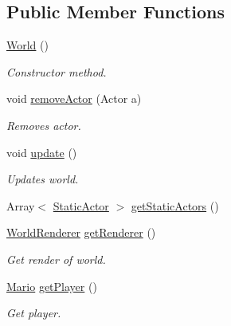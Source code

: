\subsection*{Public Member Functions}
\begin{DoxyCompactItemize}
\item 
\hyperlink{classnl_1_1arjanfrans_1_1mario_1_1model_1_1World_abc0eb7717682f6f00f139647207d425b}{World} ()
\begin{DoxyCompactList}\small\item\em Constructor method. \end{DoxyCompactList}\item 
void \hyperlink{classnl_1_1arjanfrans_1_1mario_1_1model_1_1World_a73b951d2722bc1984021d0e4da644008}{remove\+Actor} (Actor a)
\begin{DoxyCompactList}\small\item\em Removes actor. \end{DoxyCompactList}\item 
\mbox{\label{classnl_1_1arjanfrans_1_1mario_1_1model_1_1World_a09caf085ce851f56c9773c9c83e3eff8}} 
void \hyperlink{classnl_1_1arjanfrans_1_1mario_1_1model_1_1World_a09caf085ce851f56c9773c9c83e3eff8}{update} ()
\begin{DoxyCompactList}\small\item\em Updates world. \end{DoxyCompactList}\item 
Array$<$ \hyperlink{classnl_1_1arjanfrans_1_1mario_1_1model_1_1StaticActor}{Static\+Actor} $>$ \hyperlink{classnl_1_1arjanfrans_1_1mario_1_1model_1_1World_a1f0db37c4fbacb1048e6cd13725305aa}{get\+Static\+Actors} ()
\item 
\hyperlink{classnl_1_1arjanfrans_1_1mario_1_1view_1_1WorldRenderer}{World\+Renderer} \hyperlink{classnl_1_1arjanfrans_1_1mario_1_1model_1_1World_a931f9fe3450c07ec17c8f14dcd3ec58e}{get\+Renderer} ()
\begin{DoxyCompactList}\small\item\em Get render of world. \end{DoxyCompactList}\item 
\hyperlink{classnl_1_1arjanfrans_1_1mario_1_1model_1_1Mario}{Mario} \hyperlink{classnl_1_1arjanfrans_1_1mario_1_1model_1_1World_a08a107e2e429df5092b7bd2198d4553a}{get\+Player} ()
\begin{DoxyCompactList}\small\item\em Get player. \end{DoxyCompactList}\item 

\end{DoxyCompactItemize}
